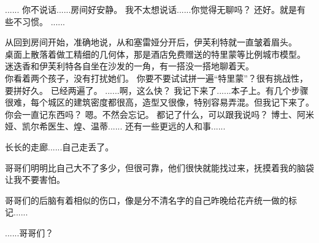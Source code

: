 \documentclass[openany]{book}
\begin{document}
\begin{dialogue}
     ......
     你不说话......房间好安静。
     我不太想说话......你觉得无聊吗？
     还好。就是有些不习惯。
     ......\par
    从回到房间开始，准确地说，从和塞雷娅分开后，伊芙利特就一直皱着眉头。\\
    桌面上散落着做工精细的几何体，那是酒店免费赠送的特里蒙等比例城市模型。\\
    迷迭香和伊芙利特各自坐在沙发的一角，有一搭没一搭地聊着天。\\
    你看着两个孩子，没有打扰她们。
     你要不要试试拼一遍“特里蒙”？很有挑战性，要拼好久。
     已经两遍了。
     ......啊，这么快？
     我记下来了......本子上。有几个步骤很难，每个城区的建筑密度都很高，造型又很像，特别容易弄混。但我记下来了。
     你会一直记东西吗？
     嗯。不然会忘记。
     都记了什么，可以跟我说吗？
     博士、阿米娅、凯尔希医生、煌、温蒂......
     还有一些更远的人和事......
\end{dialogue}

{
长长的走廊......自己走丢了。\par
哥哥们明明比自己大不了多少，但很可靠，他们很快就能找过来，抚摸着我的脑袋让我不要害怕。\par
哥哥们的后脑有着相似的伤口，像是分不清名字的自己昨晚给花卉统一做的标记......\par
......哥哥们？
}
\end{document}
